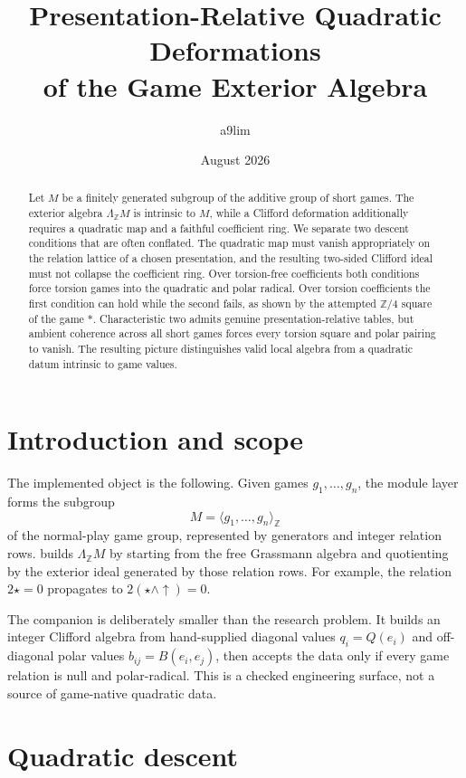 \documentclass[11pt]{article}
\title{Presentation-Relative Quadratic Deformations\\
of the Game Exterior Algebra}
\author{a9lim}
\date{August 2026}
\theoremstyle{remark}
\newcommand{\Z}{\mathbb{Z}}
\begin{document}
\maketitle

\begin{abstract}
Let $M$ be a finitely generated subgroup of the additive group of short games.
The exterior algebra $\Lambda_{\Z}M$ is intrinsic to $M$, while a Clifford
deformation additionally requires a quadratic map and a faithful coefficient
ring. We separate two descent conditions that are often conflated. The
quadratic map must vanish appropriately on the relation lattice of a chosen
presentation, and the resulting two-sided Clifford ideal must not collapse
the coefficient ring. Over torsion-free coefficients both conditions force
torsion games into the quadratic and polar radical. Over torsion coefficients
the first condition can hold while the second fails, as shown by the attempted
$\Z/4$ square of the game $*$. Characteristic two admits genuine
presentation-relative tables, but ambient coherence across all short games
forces every torsion square and polar pairing to vanish. The resulting picture
distinguishes valid local algebra from a quadratic datum intrinsic to game
values.
\end{abstract}

\section{Introduction and scope}

The implemented object is the following. Given games
$g_1,\dots,g_n$, the module layer forms the subgroup
\[
  M=\langle g_1,\dots,g_n\rangle_{\Z}
\]
of the normal-play game group, represented by generators and integer relation
rows.   builds
$\Lambda_{\Z}M$ by starting from the free Grassmann algebra and quotienting by
the exterior ideal generated by those relation rows.  For example, the relation
$2\star=0$ propagates to $2(\star\wedge\uparrow)=0$.

The companion  is deliberately smaller
than the research problem.  It builds an integer Clifford algebra from
hand-supplied diagonal values $q_i=Q(e_i)$ and off-diagonal polar values
$b_{ij}=B(e_i,e_j)$, then accepts the data only if every game relation is null
and polar-radical.  This is a checked engineering surface, not a source of
game-native quadratic data.

\section{Quadratic descent}
\end{document}
